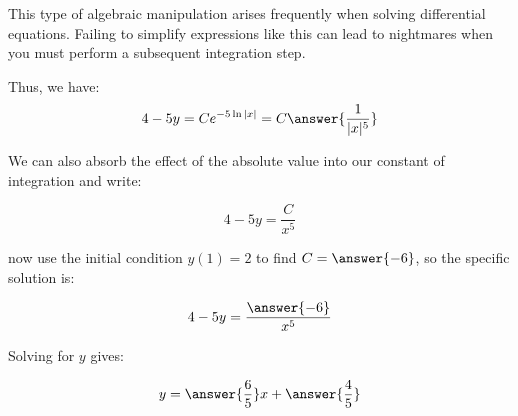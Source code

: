 \documentclass{ximera}
\begin{document}
\begin{exercise}
\begin{hint}
\begin{question}
\begin{question}
\begin{remark}
This type of algebraic manipulation arises frequently when solving differential equations.  Failing to simplify expressions like this can lead to nightmares when you must perform a subsequent integration step.
\end{remark}

Thus, we have:
\[
4-5y = Ce^{-5 \ln|x|} = C\answer{\frac{1}{|x|^5}}
\]

We can also absorb the effect of the absolute value into our constant of integration and write:

\[
4-5y = \frac{C}{x^5}
\]

 now use the initial condition $y(1) = 2$ to find $C = \answer{-6}$, so the specific solution is:

\[
4-5y = \frac{\answer{-6}}{x^5}
\]

Solving for $y$ gives:

\[
y = \answer{\frac{6}{5}}x+\answer{\frac{4}{5}}
\]

\end{question}
\end{question}
 \end{hint}
 
\end{exercise}
\end{document}
